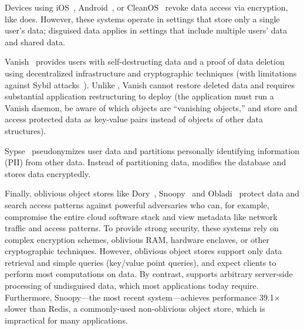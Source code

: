 %
Devices using iOS~\cite{applesecurity}, Android~\cite{applesecurity}, or
CleanOS~\cite{cleanos} revoke data access via encryption, like \sys does.
%
However, these systems operate in settings that store only a single user's data;
disguised data applies in settings that include multiple users' data and shared
data.
%

%
Vanish~\cite{vanish} provides users with self-destructing data and a proof of
data deletion using decentralized infrastructure and cryptographic techniques
(with limitations against Sybil attacks~\cite{defeat_vanish}). Unlike \sys,
Vanish cannot restore deleted data and requires substantial application
restructuring to deploy (\eg the application must run a Vanish daemon, be aware of which
objects are ``vanishing objects,'' and store and access protected data
as key-value pairs instead of objects of other data structures).
%

%
Sypse~\cite{sypse} pseudonymizes user data and partitions personally identifying
information (PII) from other data. Instead of partitioning data, \sys modifies
the database and stores \xxed data encryptedly.
%

%
Finally, oblivious object stores like Dory~\cite{dory}, Snoopy~\cite{snoopy} and
Obladi~\cite{obladi} protect data and search access patterns against powerful
adversaries who can, for example, compromise the entire cloud software stack and
view metadata like network traffic and access patterns. To provide strong
security, these systems rely on complex encryption schemes, oblivious RAM,
hardware enclaves, or other cryptographic techniques.
%
However, oblivious object stores support only data retrieval and simple queries
(\eg key/value point queries), and expect clients to perform most 
computations on data.
%
By contrast, \sys supports arbitrary server-side processing of undisguised
data, which most applications today require. 
%
Furthermore, Snoopy---the most recent system---achieves performance 39.1$\times$ slower than Redis, a
commonly-used non-oblivious object store, which is impractical for many 
applications.


%
%
%

